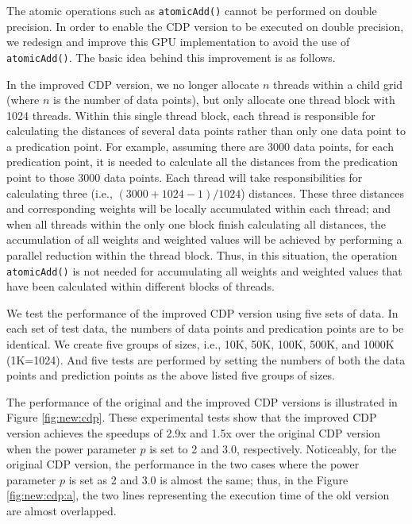 The atomic operations such as \texttt{atomicAdd()} cannot be performed on double 
precision. In order to enable the CDP version to be executed on double 
precision, we redesign and improve this GPU implementation to avoid the use of 
\texttt{atomicAdd()}. The basic idea behind this improvement is as follows.

In the improved CDP version, we no longer allocate $n$ threads within a child 
grid (where $n$ is the number of data points), but  only allocate one thread 
block with 1024 threads. Within this single thread block, each thread is 
responsible for calculating the distances of several data points rather than 
only one data point to a predication point. For example, assuming there are 
3000 data points, for each predication point, it is needed to calculate all 
the distances from the predication point to those 3000 data points. Each 
thread will take responsibilities for calculating three (i.e., $(3000 + 1024 - 1) 
/ 1024$) distances. These three distances and corresponding weights will be 
locally accumulated within each thread; and when all threads within the only 
one block finish calculating all distances, the accumulation of all weights 
and weighted values will be achieved by performing a parallel reduction 
\cite{harris2007} within the thread block. Thus, in this situation, the operation 
\texttt{atomicAdd()} is not needed for accumulating all weights and weighted values 
that have been calculated within different blocks of threads. 

We test the performance of the improved CDP version using five sets of data. In each set of test data, the numbers of data points and predication points are to be identical. We create five groups of sizes, i.e., 10K, 50K, 100K, 500K, and 1000K (1K=1024). And five tests are performed by setting the numbers of both the data points and prediction points as the above listed five groups of sizes. 

The performance of the original and the improved CDP versions is illustrated in Figure \ref{fig:new:cdp}. These experimental tests show that the improved CDP version achieves the speedups of 2.9x and 1.5x over the original CDP version when the power parameter $p$ is set to 2 and 3.0, respectively. Noticeably, for the original CDP version, the performance in the two cases where the power parameter $p$ is set as 2 and 3.0 is almost the same; thus, in the Figure \ref{fig:new:cdp:a}, the two lines representing the execution time of the old version are almost overlapped. 



